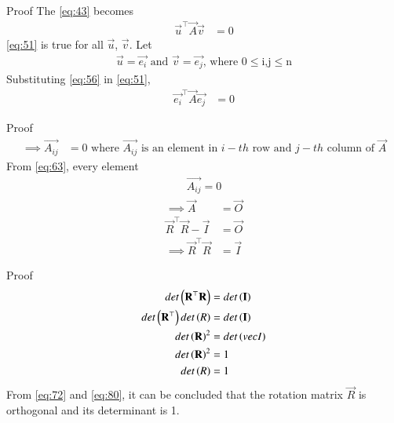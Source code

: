 \documentclass{beamer}
\begin{document}
\begin{frame}{Proof}
The \eqref{eq:43} becomes
\begin{align}
    \vec{u}^\top\vec{A}\vec{v} &= 0 \label{eq:51}
\end{align}
\eqref{eq:51} is true for all $\vec{u}$, $\vec{v}$.
Let
\begin{align}
    \vec{u} = \vec{e_i}\text{ and }\vec{v} = \vec{e_j}\text{, where 0$\leq$i,j$\leq$n} \label{eq:56}
\end{align}
Substituting \eqref{eq:56} in \eqref{eq:51},
\begin{align}
    \vec{e_i}^\top\vec{A}\vec{e_j} &= 0
\end{align}
\end{frame}

\begin{frame}{Proof}
\begin{align}
    \implies \vec{A_{ij}} &= 0\text{ where $\vec{A_{ij}}$ is an element in $i-th$ row and $j-th$ column of $\vec{A}$} \label{eq:63}
\end{align}
From \eqref{eq:63}, every element 
\begin{align}
    \vec{A_{ij}} = 0
\end{align}
\begin{align}
    \implies \vec{A} &= \vec{O} \\
    \vec{R}^\top\vec{R} - \vec{I} &= \vec{O} \\
    \implies \vec{R}^\top\vec{R} &= \vec{I} \label{eq:72}
\end{align}
\end{frame}

\begin{frame}{Proof}
\begin{align}
    det\left(\mathbf{R}^\top\mathbf{R}\right) &= det\left(\mathbf{I}\right) \\
    det\left(\mathbf{R}^\top\right)det\left(R\right) &= det\left(\mathbf{I}\right) \\
    det\left(\mathbf{R}\right)^2 &= det\left(vec{I}\right) \\
    det\left(\mathbf{R}\right)^2 &= 1 \\
    det\left(R\right) &= 1 \label{eq:80}
\end{align}
From \eqref{eq:72} and \eqref{eq:80}, it can be concluded that the rotation matrix $\vec{R}$ is orthogonal and its determinant is 1.
\end{frame}
\end{document}
